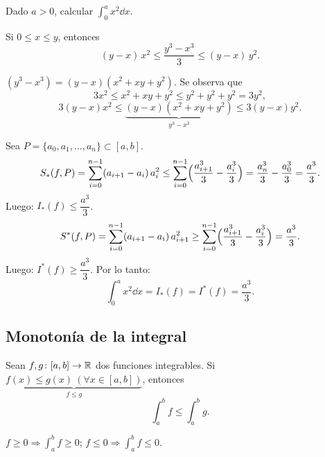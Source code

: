 \documentclass[11pt,a4paper]{article}
\begin{document}
\begin{ejemplo}
Dado $a>0$, calcular $\displaystyle\int_0^a x^2\dd x$.

\begin{center}
\end{center}

\begin{lema}
Si $0\le x\le y$, entonces
\[
  (y-x)\,x^2\le\frac{y^3-x^3}{3}\le(y-x)\,y^2.
\]
\end{lema}

\begin{demo}
$(y^3-x^3)=(y-x)(x^2+xy+y^2)$. Se observa que
\[
  3x^2\le x^2+xy+y^2\le y^2+y^2+y^2=3y^2,
\]
\[
  3(y-x)x^2\le\underbrace{(y-x)(x^2+xy+y^2)}_{y^3-x^3}\le 3(y-x)y^2.
\]
\end{demo}

Sea $P=\{a_0,a_1,\dots,a_n\}\subset[a,b]$.
\[
  S_*(f,P)=\sum_{i=0}^{n-1}(a_{i+1}-a_i)\,a_i^2
  \le\sum_{i=0}^{n-1}\Bigl(\frac{a_{i+1}^3}{3}-\frac{a_i^3}{3}\Bigr)
  =\frac{a_n^3}{3}-\frac{a_0^3}{3}=\frac{a^3}{3}.
\]
Luego: $I_*(f)\le\dfrac{a^3}{3}$.
\[
  S^*(f,P)=\sum_{i=0}^{n-1}(a_{i+1}-a_i)\,a_{i+1}^2
  \ge\sum_{i=0}^{n-1}\Bigl(\frac{a_{i+1}^3}{3}-\frac{a_i^3}{3}\Bigr)=\frac{a^3}{3}.
\]
Luego: $I^*(f)\ge\dfrac{a^3}{3}$. Por lo tanto:
\[
  \int_0^a x^2\dd x=I_*(f)=I^*(f)=\frac{a^3}{3}.
\]
\end{ejemplo}

\subsection{Monotonía de la integral}

\begin{proposicion}
Sean $f,g\colon[a,b]\to\mathbb{R}$ dos funciones integrables. Si $\underbrace{f(x)\le g(x)\ (\forall x\in[a,b])}_{f\le g}$, entonces
\[
  \int_a^b f\le\int_a^b g.
\]
\end{proposicion}

\begin{corolario}
$f\ge0\Rightarrow\displaystyle\int_a^b f\ge0$; \qquad $f\le0\Rightarrow\displaystyle\int_a^b f\le0$.
\end{corolario}
\end{document}
